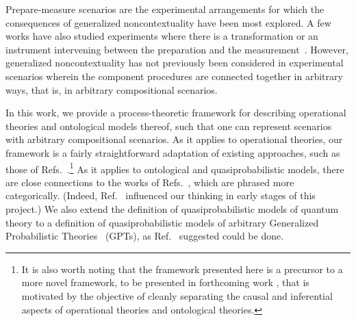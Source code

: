 \documentclass[10pt,twocolumn,aps,groupedaddress,nofootinbib]{revtex4}
\begin{document}
Prepare-measure scenarios are the experimental arrangements for which the consequences of generalized noncontextuality have been most explored.
A few works have also studied experiments where there is a transformation or an instrument intervening between the preparation and the measurement~\cite{lillystone2019single,PP1,PP2,AWV,AWVrobust,Lostaglio2020contextualadvantage}.
However, generalized noncontextuality has not previously been considered in
experimental scenarios wherein the component procedures are connected together in arbitrary ways, that is, in arbitrary compositional scenarios.

In this work, we provide a process-theoretic \cite{coecke2015categorical,coecke2017picturing,selbyReconstruction,gogioso2017categorical} framework for describing operational theories and ontological models thereof, such that one can
 represent scenarios with arbitrary compositional scenarios.
 As it applies to operational theories, our framework is a fairly straightforward adaptation of existing approaches, such as those of Refs.~\cite{chiribella2010probabilistic,hardy2011reformulating,gogioso2017categorical,coecke2017picturing}.\footnote{It is also worth noting that the framework presented here is a precursor to a more novel framework, to be presented in
forthcoming work \cite{schmid2020unscrambling}, that is motivated by the objective of
 cleanly separating
the causal and inferential aspects of operational theories and ontological theories.}  As it applies to ontological and quasiprobabilistic models, there are close connections to the works of Refs.~\cite{van2017quantum,gheorghiu2019ontological}, which are phrased more categorically.
 (Indeed, Ref.~\cite{van2017quantum} influenced our thinking in early stages of this project.)
We also extend the definition of quasiprobabilistic models of quantum theory to a definition of quasiprobabilistic models of arbitrary Generalized Probabilistic Theories~\cite{hardy2001quantum,barrett2007,chiribella2010probabilistic,hardy2011reformulating} (GPTs), as Ref.~\cite{van2017quantum} suggested could be done.
\end{document}
